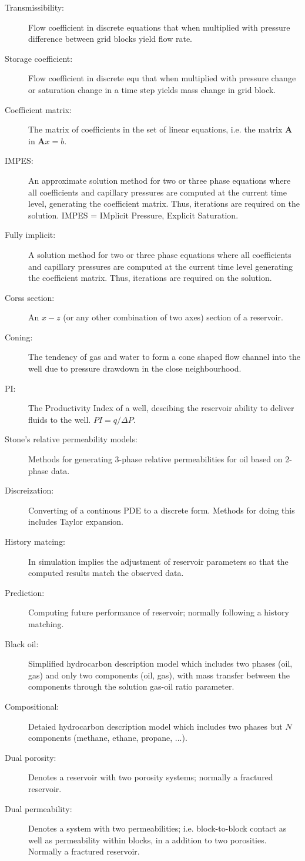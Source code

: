 \begin{description}
  \item[Transmissibility:] Flow coefficient in discrete equations that when multiplied with pressure difference between grid blocks yield flow rate.
  \item[Storage coefficient:] Flow coefficient in discrete equ that when multiplied with pressure change or saturation change in a time step yields mass change in grid block.
  \item[Coefficient matrix:] The matrix of coefficients in the set of linear equations, i.e. the matrix $\mathbf{A}$ in $\mathbf{A}x=b$.
  \item[IMPES:] An approximate solution method for two or three phase equations where all coefficients and capillary pressures are computed at the current time level, generating the coefficient matrix. Thus, iterations are required on the solution. IMPES = IMplicit Pressure, Explicit Saturation.
  \item[Fully implicit:] A solution method for two or three phase equations where all coefficients and capillary pressures are computed at the current time level generating the coefficient matrix. Thus, iterations are required on the solution.
  \item[Corss section:] An $x-z$ (or any other combination of two axes) section of a reservoir.
  \item[Coning:] The tendency of gas and water to form a cone shaped flow channel into the well due to pressure drawdown in the close neighbourhood.
  \item[PI:] The Productivity Index of a well, descibing the reservoir ability to deliver fluids to the well. $PI=q/\Delta P$.
  \item[Stone's relative permeability models:] Methods for generating 3-phase relative permeabilities for oil based on 2-phase data.
  \item[Discreization:] Converting of a continous PDE to a discrete form. Methods for doing this includes Taylor expansion.
  \item[History matcing:] In simulation implies the adjustment of reservoir parameters so that the computed results match the observed data.
  \item[Prediction:] Computing future performance of reservoir; normally following a history matching.
  \item[Black oil:] Simplified hydrocarbon description model which includes two phases (oil, gas) and only two components (oil, gas), with mass transfer between the components through the solution gas-oil ratio parameter.
  \item[Compositional:] Detaied hydrocarbon description model which includes two phases but $N$ components (methane, ethane, propane, ...).
  \item[Dual porosity:] Denotes a reservoir with two porosity systems; normally a fractured reservoir.
  \item[Dual permeability:] Denotes a system with two permeabilities; i.e. block-to-block contact as well as permeability within blocks, in a addition to two porosities. Normally a fractured reservoir.
\end{description}

